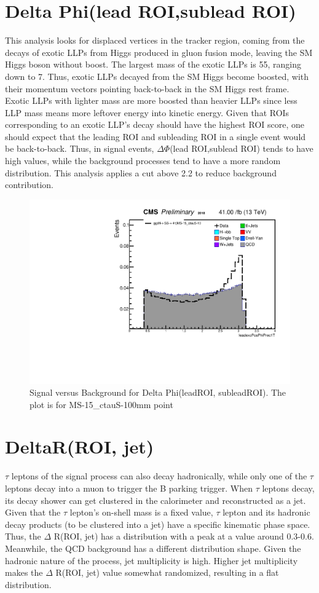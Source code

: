 \section{Delta Phi(lead ROI,sublead ROI)}\label{sec:DeltaPhi}
This analysis looks for displaced vertices in the tracker region, coming from the decays of exotic LLPs from Higgs produced in gluon fusion mode, leaving the SM Higgs boson without boost.
The largest mass of the exotic LLPs is 55\GeV, ranging down to 7\GeV.
Thus, exotic LLPs decayed from the SM Higgs become boosted, with their momentum vectors pointing back-to-back in the SM Higgs rest frame.
Exotic LLPs with lighter mass are more boosted than heavier LLPs since less LLP mass means more leftover energy into kinetic energy.
Given that ROIs corresponding to an exotic LLP's decay should have the highest ROI score, one should expect that the leading ROI and subleading ROI in a single event would be back-to-back.
Thus, in signal events, $\Delta\Phi$(lead ROI,sublead ROI) tends to have high values, while the background processes tend to have a more random distribution.
This analysis applies a cut above 2.2 to reduce background contribution.



 \begin{figure}[h!]
   \label{fig:leadexcPosPhi}
   \centering
   \includegraphics[width=0.50\linewidth]{figs/EraASR_MS-15_ctauS-10_leadexcPosPhiPrec1T.pdf}
   \caption{Signal versus Background for Delta Phi(leadROI, subleadROI). The plot is for MS-15\_ctauS-100mm point}
 \end{figure}


\section{DeltaR(ROI, jet)}\label{ref:jetdR}
$\tau$ leptons of the signal process can also decay hadronically, while only one of the $\tau$ leptons decay into a muon to trigger the B parking trigger.
When $\tau$ leptons decay, its decay shower can get clustered in the calorimeter and reconstructed as a jet.
Given that the $\tau$ lepton's on-shell mass is a fixed value, $\tau$ lepton and its hadronic decay products (to be clustered into a jet) have a specific kinematic phase space.
Thus, the $\Delta$ R(ROI, jet) has a distribution with a peak at a value around 0.3-0.6.
Meanwhile, the QCD background has a different distribution shape.
Given the hadronic nature of the process, jet multiplicity is high.
Higher jet multiplicity makes the $\Delta$ R(ROI, jet) value somewhat randomized, resulting in a flat distribution.


